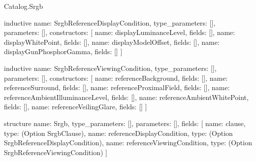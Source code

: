 \begin{lexlean}{Catalog.Srgb}
\begin{semanticmodule}
inductive{
  name: SrgbReferenceDisplayCondition,
  type_parameters: [],
  parameters: [],
  constructors: [
    {name: displayLuminanceLevel, fields: []},
    {name: displayWhitePoint, fields: []},
    {name: displayModelOffset, fields: []},
    {name: displayGunPhosphorGamma, fields: []}
  ]
}

inductive{
  name: SrgbReferenceViewingCondition,
  type_parameters: [],
  parameters: [],
  constructors: [
    {name: referenceBackground, fields: []},
    {name: referenceSurround, fields: []},
    {name: referenceProximalField, fields: []},
    {name: referenceAmbientIlluminanceLevel, fields: []},
    {name: referenceAmbientWhitePoint, fields: []},
    {name: referenceVeilingGlare, fields: []}
  ]
}

structure{
  name: Srgb,
  type_parameters: [],
  parameters: [],
  fields: [
    {name: clause, type: (Option SrgbClause)},
    {name: referenceDisplayCondition, type: (Option SrgbReferenceDisplayCondition)},
    {name: referenceViewingCondition, type: (Option SrgbReferenceViewingCondition)}
  ]
}
\end{semanticmodule}
\end{lexlean}
